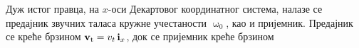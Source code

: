 \PID 
Дуж истог правца, на $x$-оси Декартовог координатног система, налазе се предајник звучних таласа кружне учестаности
$\upomega_0$, као и пријемник. Предајник се креће брзином ${\bf v}_{\rm t} = v_t\,{\bf i}_{x}$, док се пријемник креће 
брзином 